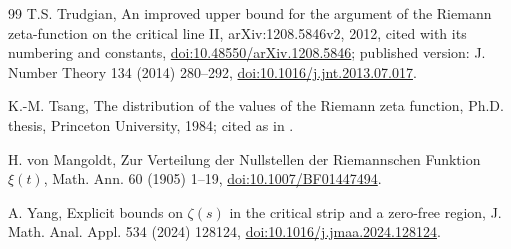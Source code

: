 \documentclass[11pt,a4paper]{article}
\makeatletter
\numberwithin{equation}{section}
\DeclareRobustCommand{\CGcite}[2][]{\if\relax\detokenize{#1}\relax\cite{#2}\else\cite[#1]{#2}\fi}
\newcommand{\CG@getbib}[1]{\@ifundefined{CGBib@#1}{#1}{\csname CGBib@#1\endcsname}}
\DeclareRobustCommand{\CGcite}[2][]{\pdftooltip{\if\relax\detokenize{#1}\relax\cite{#2}\else\cite[#1]{#2}\fi}{\CG@getbib{#2}}}
\theoremstyle{definition}
\theoremstyle{remark}
\makeatother
\begin{document}
\begin{thebibliography}{99}
 T.S. Trudgian, An improved upper bound for the argument of the Riemann zeta-function on the critical line II, arXiv:1208.5846v2, 2012, cited with its numbering and constants, \href{https://doi.org/10.48550/arXiv.1208.5846}{doi:10.48550/arXiv.1208.5846}; published version: J. Number Theory 134 (2014) 280--292, \href{https://doi.org/10.1016/j.jnt.2013.07.017}{doi:10.1016/j.jnt.2013.07.017}.

 K.-M. Tsang, The distribution of the values of the Riemann zeta function, Ph.D. thesis, Princeton University, 1984; cited as in \CGcite[\S3]{FazzariGerspachMinelli2025}.

 H. von Mangoldt, Zur Verteilung der Nullstellen der Riemannschen Funktion $\xi(t)$, Math. Ann. 60 (1905) 1--19, \href{https://doi.org/10.1007/BF01447494}{doi:10.1007/BF01447494}.

 A. Yang, Explicit bounds on $\zeta(s)$ in the critical strip and a zero-free region, J. Math. Anal. Appl. 534 (2024) 128124, \href{https://doi.org/10.1016/j.jmaa.2024.128124}{doi:10.1016/j.jmaa.2024.128124}.

\end{thebibliography}
\end{document}
